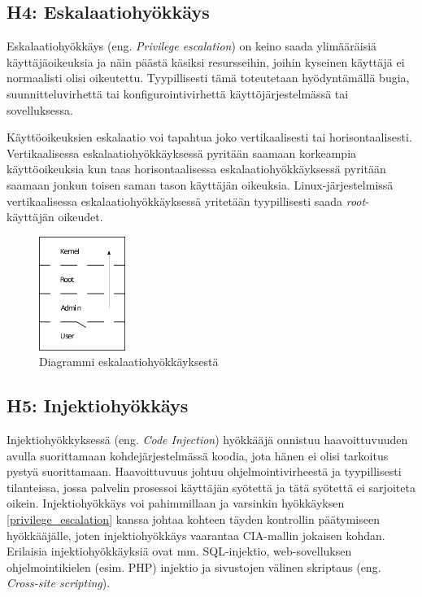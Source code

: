 \subsection{H4: Eskalaatiohyökkäys}
Eskalaatiohyökkäys (eng. \textit{Privilege escalation}) on keino saada ylimääräisiä käyttäjäoikeuksia ja näin päästä käsiksi resursseihin, joihin kyseinen käyttäjä ei normaalisti olisi oikeutettu. Tyypillisesti tämä toteutetaan hyödyntämällä bugia, suunnitteluvirhettä tai konfigurointivirhettä käyttöjärjestelmässä tai sovelluksessa.

Käyttöoikeuksien eskalaatio voi tapahtua joko vertikaalisesti tai horisontaalisesti. Vertikaalisessa eskalaatiohyökkäyksessä pyritään saamaan korkeampia käyttöoikeuksia kun taas horisontaalisessa eskalaatiohyökkäyksessä pyritään saamaan jonkun toisen saman tason käyttäjän oikeuksia. Linux-järjestelmissä vertikaalisessa eskalaatiohyökkäyksessä yritetään tyypillisesti saada \textit{root}-käyttäjän oikeudet.~\cite{ciampa2012security+}

\begin{figure}
\centering \includegraphics[width=0.25\textwidth]{kuvat/privilege_escalation.png}
\caption{Diagrammi eskalaatiohyökkäyksestä~\cite{wikipedia:privilege_escalation}}
\label{privilege_escalation_diagram} 
\end{figure}

\subsection{H5: Injektiohyökkäys}
Injektiohyökkyksessä (eng. \textit{Code Injection}) hyökkääjä onnistuu haavoittuvuuden avulla suorittamaan kohdejärjestelmässä koodia, jota hänen ei olisi tarkoitus pystyä suorittamaan. Haavoittuvuus johtuu ohjelmointivirheestä ja tyypillisesti tilanteissa, jossa palvelin prosessoi käyttäjän syötettä ja tätä syötettä ei sarjoiteta oikein. Injektiohyökkäys voi pahimmillaan ja varsinkin hyökkäyksen \ref{privilege_escalation} kanssa johtaa kohteen täyden kontrollin päätymiseen hyökkääjälle, joten injektiohyökkäys vaarantaa CIA-mallin jokaisen kohdan. Erilaisia injektiohyökkäyksiä ovat mm. SQL-injektio, web-sovelluksen ohjelmointikielen (esim. PHP) injektio ja sivustojen välinen skriptaus (eng. \textit{Cross-site scripting}).

